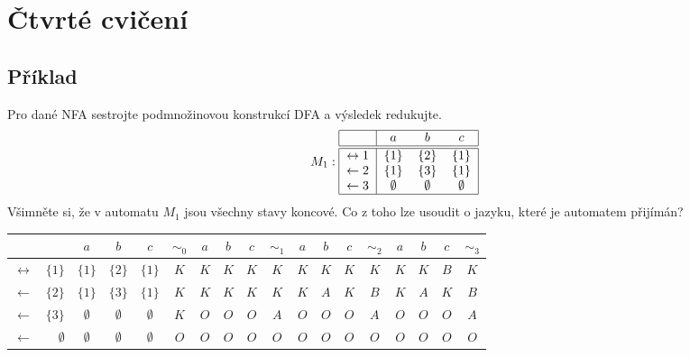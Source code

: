 \section{Čtvrté cvičení}

\subsection{Příklad}
Pro dané NFA sestrojte podmnožinovou konstrukcí DFA a výsledek redukujte.
\[
M_1:
\begin{tabular}{|r|c c c|}
    \hline
    & $a$ & $b$ & $c$\\
    \hline
    \hline
    $\leftrightarrow 1$& $\{1\}$ & $\{2\}$& $\{1\}$\\
    $\leftarrow2$      & $\{1\}$ & $\{3\}$& $\{1\}$\\
    $\leftarrow3$      & $\emptyset$ & $\emptyset$& $\emptyset$\\
    \hline
\end{tabular}
\]
Všimněte si, že v automatu $M_1$ jsou všechny stavy koncové. Co z toho lze usoudit o jazyku, které je automatem přijímán?
\begin{center}
    \begin{tabular}{|r r|c c c||c|c c c||c|c c c||c|c c c||c|}
        \hline
        & $ $ & $ a $ & $ b $ & $ c $ & $ \sim_0 $ & $ a $ & $ b $ & $ c $ & $ \sim_1 $ & $ a $ & $ b $ & $ c $ & $ \sim_2 $ & $ a $ & $ b $ & $ c $ & $ \sim_3 $ \\ \hline \hline
        $\leftrightarrow$ & $\{1\}  $ & $ \{1\} $ & $ \{2\} $ & $ \{1\} $ & $ K $ & $ K $ & $ K $ & $ K $ & $ K $ & $ K $ & $ K $ & $ K $ & $ K $ & $ K $ & $ K $ & $ B $ & $ K $ \\
        $\leftarrow$     & $\{2\}  $ & $ \{1\} $ & $ \{3\}  $ & $ \{1\} $ & $ K $ & $ K $ & $ K $ & $ K $ & $ K $ & $ K $ &$ A $ & $ K $ & $ B $ & $ K $ & $ A $ & $ K $ & $ B $ \\
        $\leftarrow$     & $ \{3\} $ & $ \emptyset $ & $ \emptyset $ & $ \emptyset $ & $ K $ & $ O $ & $ O $ & $ O $ & $ A $ & $ O $ & $ O $ & $ O $ & $ A $ & $ O $ & $ O $ & $ O $ & $ A $ \\
        $\leftarrow$     & $ \emptyset $ & $ \emptyset $ & $ \emptyset $ & $ \emptyset $ & $ O $ & $ O $ & $ O $ & $ O $ & $ O $ & $ O $ & $ O $ & $ O $ & $ O $ & $ O $ & $ O $ & $ O $ & $ O $ \\
        \hline
\end{tabular}\\
\end{center}


